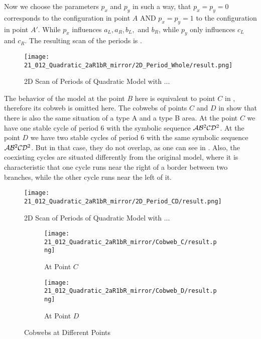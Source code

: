 Now we choose the parameters $p_x$ and $p_y$ in such a way, that $p_x = p_y = 0$ corresponds to the configuration in point $A$ AND $p_x = p_y = 1$ to the configuration in point $A'$.
While $p_x$ influences $a_L, a_R, b_L,$ and $b_R$, while $p_y$ only influences $c_L$ and $c_R$.
The resulting scan of the periods is .

\begin{figure}
    \centering
    \texttt{[image: 21\_012\_Quadratic\_2aR1bR\_mirror/2D\_Period\_Whole/result.png]}
    \caption{2D Scan of Periods of Quadratic Model with ...}
    \label{fig:quadratic.full.2aR1bR_mirr.1.2d.whole}
\end{figure}

The behavior of the model at the point $B$ here is equivalent to point $C$ in , therefore its cobweb is omitted here.
The cobwebs of points $C$ and $D$ in  show that there is also the same situation of a type A and a type B area.
At the point $C$ we have one stable cycle of period 6 with the symbolic sequence $\mathcal{A}\mathcal{B}^2\mathcal{C}\mathcal{D}^2$.
At the point $D$ we have two stable cycles of period 6 with the same symbolic sequence $\mathcal{A}\mathcal{B}^2\mathcal{C}\mathcal{D}^2$.
But in that case, they do not overlap, as one can see in .
Also, the coexisting cycles are situated differently from the original model, where it is characteristic that one cycle runs near the right of a border between two branches, while the other cycle runs near the left of it.

\begin{figure}
    \centering
    \texttt{[image: 21\_012\_Quadratic\_2aR1bR\_mirror/2D\_Period\_CD/result.png]}
    \caption{2D Scan of Periods of Quadratic Model with ...}
    \label{fig:quadratic.full.2aR1bR_mirr.1.2d.CD}
\end{figure}

\begin{figure}
    \centering
    \begin{subfigure}{0.4\textwidth}
        \centering
        \texttt{[image: 21\_012\_Quadratic\_2aR1bR\_mirror/Cobweb\_C/result.png]}
        \caption{At Point $C$}
        \label{fig:quad.full.2aR1bR_cL_mirr.1.CobwebC}
    \end{subfigure}
    \begin{subfigure}{0.4\textwidth}
        \centering
        \texttt{[image: 21\_012\_Quadratic\_2aR1bR\_mirror/Cobweb\_D/result.png]}
        \caption{At Point $D$}
        \label{fig:quad.full.2aR1bR_cL_mirr.1.CobwebD}
    \end{subfigure}
    \caption{Cobwebs at Different Points}
    \label{fig:quad.full.2aR1bR_cL_mirr.1.CobwebsCD}
\end{figure}


